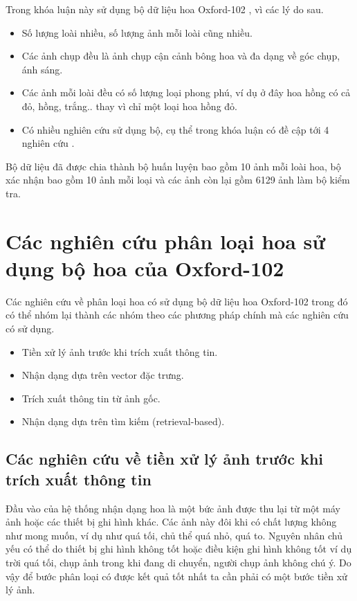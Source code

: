 \documentclass[12pt]{report}
\begin{document}
		Trong khóa luận này sử dụng bộ dữ liệu hoa Oxford-102 \cite{cia-Nilsback06}, vì các lý do sau.
																																																				
		\begin{itemize}
			\item Số lượng loài nhiều, số lượng ảnh mỗi loài cũng nhiều.
			\item Các ảnh chụp đều là ảnh chụp cận cảnh bông hoa và đa dạng về góc chụp, ánh sáng.
			\item Các ảnh mỗi loài đều có số lượng loại phong phú, ví dụ ở đây hoa hồng có cả đỏ, hồng, trắng.. thay vì chỉ một loại hoa hồng đỏ.
			\item Có nhiều nghiên cứu sử dụng bộ, cụ thể trong khóa luận có đề cập tới 4 nghiên cứu \cite{cia-Nilsback06} \cite{cia-Nilsback08} \cite{cia-ONE} \cite{cia-CNNFeatures off-the-shelf}.
		\end{itemize}				
																																																								
		Bộ dữ liệu đã được chia thành bộ huấn luyện bao gồm 10 ảnh mỗi loài hoa, bộ xác nhận bao gồm 10 ảnh mỗi loại và các ảnh còn lại gồm 6129 ảnh làm bộ kiểm tra. 	
																																																						
		\section{Các nghiên cứu phân loại hoa sử dụng bộ hoa của Oxford-102}
		Các nghiên cứu về phân loại hoa \cite{cia-Nilsback06} \cite{cia-Nilsback08} \cite{cia-ONE} \cite{cia-CNNFeatures off-the-shelf} có sử dụng bộ dữ liệu hoa Oxford-102 \cite{cia-Nilsback06} trong đó có thể nhóm lại thành các nhóm theo các phương pháp chính mà các nghiên cứu có sử dụng.
																																																		
		\begin{itemize}
			\item Tiền xử lý ảnh trước khi trích xuất thông tin.
			\item Nhận dạng dựa trên vector đặc trưng.
			\item Trích xuất thông tin từ ảnh gốc.
			\item Nhận dạng dựa trên tìm kiếm (retrieval-based).
		\end{itemize}
																																																		
		\subsection{Các nghiên cứu về tiền xử lý ảnh trước khi trích xuất thông tin}
		Đầu vào của hệ thống nhận dạng hoa là một bức ảnh được thu lại từ một máy ảnh hoặc các thiết bị ghi hình khác. Các ảnh này đôi khi có chất lượng không như mong muốn, ví dụ như quá tối, chủ thể quá nhỏ, quá to. Nguyên nhân chủ yếu có thể do thiết bị ghi hình không tốt hoặc điều kiện ghi hình không tốt ví dụ trời quá tối, chụp ảnh trong khi đang di chuyển, người chụp ảnh không chú ý. Do vậy để bước phân loại có được kết quả tốt nhất ta cần phải có một bước tiền xử lý ảnh. 
																																																
\end{document}
